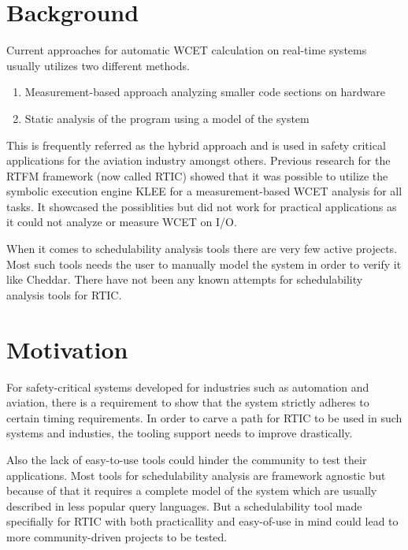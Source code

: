 \section{Background}
Current approaches for automatic WCET calculation on real-time systems usually
utilizes two different methods.
\begin{enumerate}
    \item Measurement-based approach analyzing smaller code sections on hardware
    \item Static analysis of the program using a model of the system
\end{enumerate}
This is frequently referred as the hybrid approach and is used in safety
critical applications for the aviation industry\cite{rapita} amongst others.
Previous research for the RTFM framework (now called RTIC) showed that it was
possible to utilize the symbolic execution engine KLEE for a measurement-based
WCET analysis for all tasks\cite{lindner}. It showcased the possiblities but
did not work for practical applications as it could not analyze or measure WCET
on I/O.

When it comes to schedulability analysis tools there are very few
active projects. Most such tools needs the user to manually model the system in
order to verify it like Cheddar\cite{cheddar}. There have not been any known
attempts for schedulability analysis tools for RTIC.



\section{Motivation}
For safety-critical systems developed for industries such as automation and
aviation, there is a requirement to show that the system strictly adheres to
certain timing requirements. In order to carve a path for RTIC to be used in
such systems and industies, the tooling support needs to improve drastically.

Also the lack of easy-to-use tools could hinder the community to test their
applications. Most tools for schedulability analysis are framework agnostic but
because of that it requires a complete model of the system which are usually
described in less popular query languages. But a schedulability tool made
specifially for RTIC with both practicallity and easy-of-use in mind could lead
to more community-driven projects to be tested.

